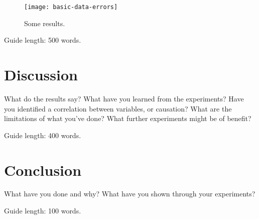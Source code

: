 \documentclass{csfourzero}
\begin{document}
\begin{figure}
\centerline{\texttt{[image: basic-data-errors]}}
\caption{Some results.}\label{fig:data}
\end{figure}

Guide length: 500 words.

\section{Discussion}
\label{sec:discuss}

What do the results say? What have you learned from the
experiments? Have you identified a correlation between variables, or
causation? What are the limitations of what you've done? What further
experiments might be of benefit?

Guide length: 400 words.

\section{Conclusion}
\label{sec:conc}

What have you done and why? What have you shown through your
experiments?

Guide length: 100 words.


\end{document}
